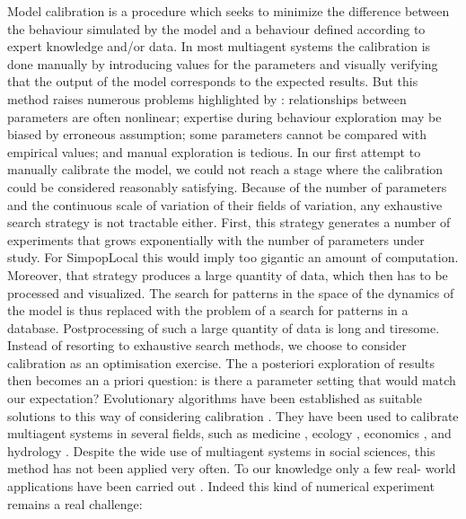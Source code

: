 Model calibration is a procedure which seeks to minimize the difference between the behaviour simulated by the model and a behaviour defined according to expert knowledge and/or data. In most multiagent systems the calibration is done manually by introducing values for the parameters and visually verifying that the output of the model corresponds to the expected results. But this method raises numerous problems highlighted by \textcite{Stonedahl2011a}: relationships between parameters are often nonlinear; expertise during behaviour exploration may be biased by erroneous assumption; some parameters cannot be compared with empirical values; and manual exploration is tedious. In our first attempt to manually calibrate the model, we could not reach a stage where the calibration could be considered reasonably satisfying. Because of the number of parameters and the continuous scale of variation of their fields of variation, any exhaustive search strategy is not tractable either. First, this strategy generates a number of experiments that grows exponentially with the number of parameters under study. For SimpopLocal this would imply too gigantic an amount of computation. Moreover, that strategy produces a large quantity of data, which then has to be processed and visualized. The search for patterns in the space of the dynamics of the model is thus replaced with the problem of a search for patterns in a database. Postprocessing of such a large quantity of data is long and tiresome. Instead of resorting to exhaustive search methods, we choose to consider calibration as an optimisation exercise. The a posteriori exploration of results then becomes an a priori question: is there a parameter setting that would match our expectation? Evolutionary algorithms have been established as suitable solutions to this way of considering calibration \autocites{Calvez2006a, Stonedahl2011a}. They have been used to calibrate multiagent systems in several fields, such as medicine \autocite{Castiglione2007}, ecology \autocite{Duboz2010}, economics \autocites{Espinosa2012, Stonedahl2010a}, and hydrology \autocite{Solomatine1999}. Despite the wide use of multiagent systems in social sciences, this method has not been applied very often. To our knowledge only a few real- world applications have been carried out \autocites{Heppenstall2007, Stonedahl2010}. Indeed this kind of numerical experiment remains a real challenge: \begin{enumerate}[label=(\arabic*),labelindent=0pt, leftmargin=*]

\end{enumerate}
